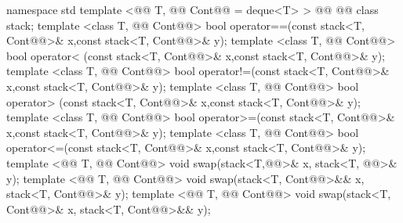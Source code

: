 \documentclass[american,twoside]{book}
\begin{document}
\begin{codeblock} 
namespace std {
  template <@@ T, @@ Cont@@ = deque<T> > 
    @@
          @@
    class stack;
  template <class T, @@ Cont@@>
    bool operator==(const stack<T, Cont@@>& x,const stack<T, Cont@@>& y);
  template <class T, @@ Cont@@>
    bool operator< (const stack<T, Cont@@>& x,const stack<T, Cont@@>& y);
  template <class T, @@ Cont@@>
    bool operator!=(const stack<T, Cont@@>& x,const stack<T, Cont@@>& y);
  template <class T, @@ Cont@@>
    bool operator> (const stack<T, Cont@@>& x,const stack<T, Cont@@>& y);
  template <class T, @@ Cont@@>
    bool operator>=(const stack<T, Cont@@>& x,const stack<T, Cont@@>& y);
  template <class T, @@ Cont@@>
    bool operator<=(const stack<T, Cont@@>& x,const stack<T, Cont@@>& y);
  template <@@ T, @@ Cont@@>
    void swap(stack<T,@@>& x, stack<T, @@>& y);
  template <@@ T, @@ Cont@@>
    void swap(stack<T, Cont@@>&& x, stack<T, Cont@@>& y);
  template <@@ T, @@ Cont@@>
    void swap(stack<T, Cont@@>& x, stack<T, Cont@@>&& y);
}
\end{codeblock}

%
\end{document}

